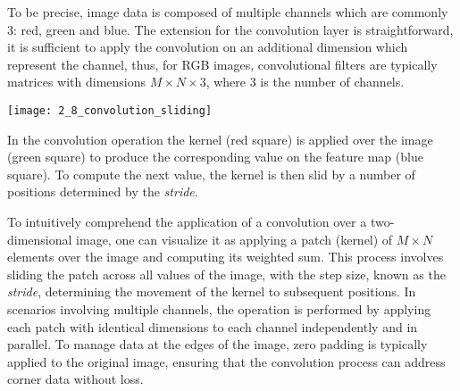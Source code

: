 To be precise, image data is composed of multiple channels which are commonly 3:
red, green and blue. The extension for the convolution layer is straightforward,
it is sufficient to apply the convolution on an additional dimension which
represent the channel, thus, for RGB images, convolutional filters are typically
matrices with dimensions $M \times N \times 3$, where $3$ is the number of
channels.
\begin{marginfigure}
  \texttt{[image: 2\_8\_convolution\_sliding]}
  \caption[2D Depiction of the Convolution Operation]{
  In the convolution operation the kernel (red square) is applied over the image
  (green square) to produce the corresponding value on the feature map (blue
  square). To compute the next value, the kernel is then slid by a number of positions determined by the \emph{stride}.
  }
\end{marginfigure}
To intuitively comprehend the application of a convolution over a
two-dimensional image, one can visualize it as applying a patch (kernel) of $M
\times N$ elements over the image and computing its weighted sum. This process
involves sliding the patch across all values of the image, with the step size,
known as the \emph{stride}, determining the movement of the kernel to subsequent
positions. In scenarios involving multiple channels, the operation is performed
by applying each patch with identical dimensions to each channel independently
and in parallel. To manage data at the edges of the image, zero padding is
typically applied to the original image, ensuring that the convolution process
can address corner data without loss.

